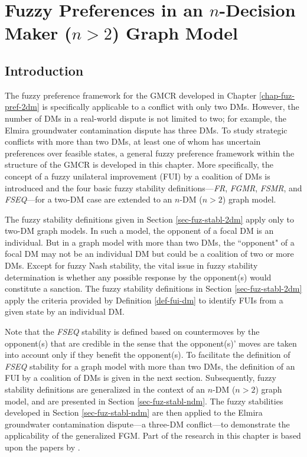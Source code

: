 \chapter{Fuzzy Preferences in an $n$-Decision Maker ($n>2$) Graph Model}\label{chap-fp-ndm-gm}

\section{Introduction}

The fuzzy preference framework for the GMCR developed in Chapter \ref{chap-fuz-pref-2dm} is specifically applicable to a conflict with only two DMs. However, the number of DMs in a real-world dispute is not limited to two; for example, the Elmira groundwater contamination dispute has three DMs. To study strategic conflicts with more than two DMs, at least one of whom has uncertain preferences over feasible states, a general fuzzy preference framework within the structure of the GMCR is developed in this chapter. More specifically, the concept of a fuzzy unilateral improvement (FUI) by a coalition of DMs is introduced and the four basic fuzzy stability definitions---\emph{FR}, \emph{FGMR}, \emph{FSMR}, and \emph{FSEQ}---for a two-DM case are extended to an $n$-DM ($n>2$) graph model.

The fuzzy stability definitions given in Section \ref{sec-fuz-stabl-2dm} apply only to two-DM graph models. In such a model, the opponent of a focal DM is an individual. But in a graph model with more than two DMs, the ``opponent" of a focal DM may not be an individual DM but could be a coalition of two or more DMs. Except for fuzzy Nash stability, the vital issue in fuzzy stability determination is whether any possible response by the opponent(s) would constitute a sanction. The fuzzy stability definitions in Section \ref{sec-fuz-stabl-2dm} apply the criteria provided by Definition \ref{def-fui-dm} to identify FUIs from a given state by an individual DM.

Note that the \emph{FSEQ} stability is defined based on countermoves by the opponent(s) that are credible in the sense that the opponent(s)' moves are taken into account only if they benefit the opponent(s). To facilitate the definition of \emph{FSEQ} stability for a graph model with more than two DMs, the definition of an FUI by a coalition of DMs is given in the next section. Subsequently, fuzzy stability definitions are generalized in the context of an $n$-DM ($n>2$) graph model, and are presented in Section \ref{sec-fuz-stabl-ndm}. The fuzzy stabilities developed in Section \ref{sec-fuz-stabl-ndm} are then applied to the Elmira groundwater contamination dispute---a three-DM conflict---to demonstrate the applicability of the generalized FGM. Part of the research in this chapter is based upon the papers by \citet{Bashar-et-al2010b, Bashar-et-al2010c, Bashar-et-al2012b, Hipel-et-al2011}.

